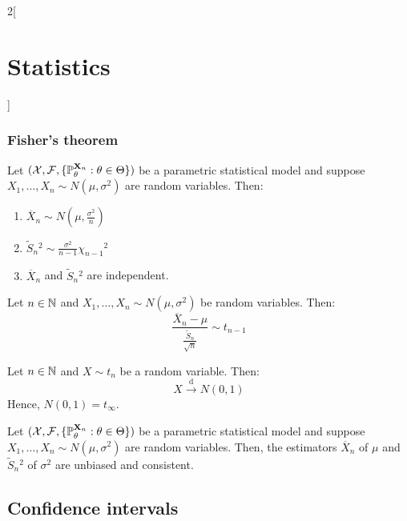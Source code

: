 \documentclass[../../../main.tex]{subfiles}
\begin{document}
\begin{multicols}{2}[\section{Statistics}]
  \subsubsection{Fisher's theorem}
  \begin{theorem}
    Let $(\mathcal{X},\mathcal{F},\{\mathbb{P}_\theta^{\boldsymbol{\mathrm{X}}_n}:\theta\in\Theta\})$ be a parametric statistical model and suppose $X_1,\ldots,X_n\sim N(\mu,\sigma^2)$ are \iid random variables. Then:
    \begin{enumerate}
      \item $\overline{X}_n\sim N\left(\mu,\frac{\sigma^2}{n}\right)$
      \item $\tilde{S}_n{}^2\sim\frac{\sigma^2}{n-1}{\chi_{n-1}}^2$
      \item $\overline{X}_n$ and $\tilde{S}_n{}^2$ are independent.
    \end{enumerate}
  \end{theorem}
  \begin{corollary}
    Let $n\in\mathbb{N}$ and $X_1,\ldots,X_n\sim N(\mu,\sigma^2)$ be \iid random variables. Then: $$\frac{\overline{X}_n-\mu}{\frac{\tilde{S}_n}{\sqrt{n}}}\sim t_{n-1}$$
  \end{corollary}
  \begin{corollary}
    Let $n\in\mathbb{N}$ and $X\sim t_n$ be a random variable. Then: $$X\overset{\text{d}}{\longrightarrow }N\left(0,1\right)$$
    Hence, $N(0,1)=t_\infty$.
  \end{corollary}
  \begin{corollary}
    Let $(\mathcal{X},\mathcal{F},\{\mathbb{P}_\theta^{\boldsymbol{\mathrm{X}}_n}:\theta\in\Theta\})$ be a parametric statistical model and suppose $X_1,\ldots,X_n\sim N(\mu,\sigma^2)$ are \iid random variables. Then, the estimators $\overline{X}_n$ of $\mu$ and $\tilde{S}_n{}^2$ of $\sigma^2$ are unbiased and consistent.
  \end{corollary}
  \begin{center}
    \begin{minipage}{\linewidth}
      \centering
      
    \end{minipage}
  \end{center}
  \subsection{Confidence intervals}

\end{multicols}
\end{document}
